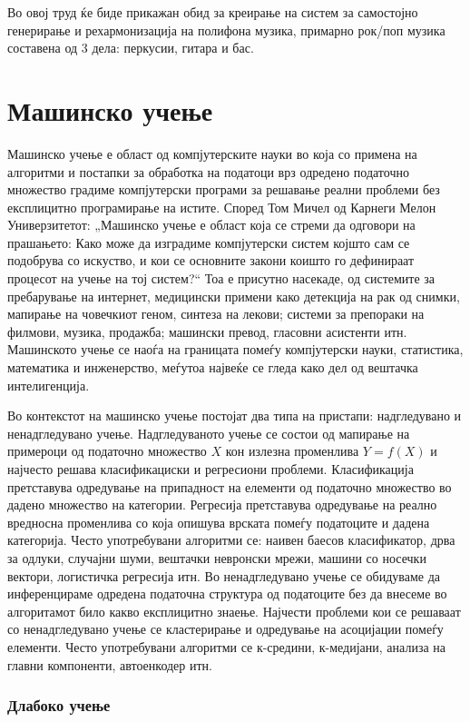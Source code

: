 Во овој труд ќе биде прикажан обид за креирање на систем за самостојно генерирање и рехармонизација на полифона музика, примарно рок/поп музика составена од 3 дела: перкусии, гитара и бас.

\chapter{Машинско учење}
\label{ch:masinsko}

Машинско учење е област од компјутерските науки во која со примена на алгоритми и постапки за обработка на податоци врз одредено податочно множество градиме компјутерски програми за решавање реални проблеми без експлицитно програмирање на истите. Според Том Мичел од Карнеги Мелон Универзитетот: „Машинско учење е област која се стреми да одговори на прашањето: Како може да изградиме компјутерски систем којшто сам се подобрува со искуство, и кои се основните закони коишто го дефинираат процесот на учење на тој систем?“ Тоа е присутно насекаде, од системите за пребарување на интернет, медицински примени како детекција на рак од снимки, мапирање на човечкиот геном, синтеза на лекови; системи за препораки на филмови, музика, продажба; машински превод, гласовни асистенти итн. Машинското учење се наоѓа на границата помеѓу компјутерски науки, статистика, математика и инженерство, меѓутоа највеќе се гледа како дел од вештачка интелигенција.

Во контекстот на машинско учење постојат два типа на пристапи: надгледувано и ненадгледувано учење. Надгледуваното учење се состои од мапирање на примероци од податочно множество $X$ кон излезна променлива $Y=f(X)$ и најчесто решава класификациски и регресиони проблеми. Класификација претставува одредување на припадност на елементи од податочно множество во дадено множество на категории. Регресија претставува одредување на реално вредносна променлива со која опишува врската помеѓу податоците и дадена категорија. Често употребувани алгоритми се: наивен баесов класификатор, дрва за одлуки, случајни шуми, вештачки невронски мрежи, машини со носечки вектори, логистичка регресија итн. 
Во ненадгледувано учење се обидуваме да инференцираме одредена податочна структура од податоците без да внесеме во алгоритамот било какво експлицитно знаење. Најчести проблеми кои се решаваат со ненадгледувано учење се кластерирање и одредување на асоцијации помеѓу елементи. Често употребувани алгоритми се к-средини, к-медијани, анализа на главни компоненти, автоенкодер итн.

\subsection{Длабоко учење}

